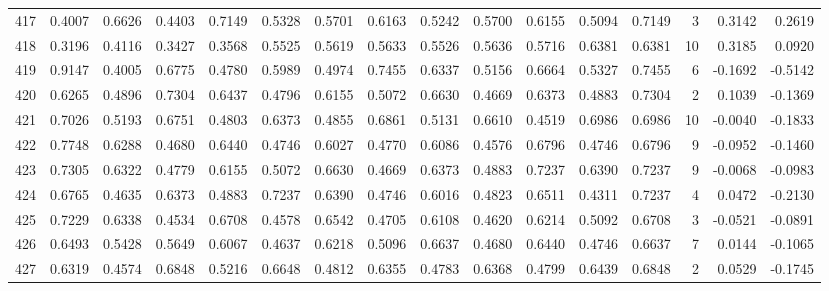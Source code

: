 \begin{tabular}{lrrrrrrrrrrrrrrr}
417 &      0.4007 &  0.6626 &  0.4403 &  0.7149 &  0.5328 &  0.5701 &  0.6163 &  0.5242 &  0.5700 &  0.6155 &   0.5094 &     0.7149 &      3 &                    0.3142 &                     0.2619 \\
418 &      0.3196 &  0.4116 &  0.3427 &  0.3568 &  0.5525 &  0.5619 &  0.5633 &  0.5526 &  0.5636 &  0.5716 &   0.6381 &     0.6381 &     10 &                    0.3185 &                     0.0920 \\
419 &      0.9147 &  0.4005 &  0.6775 &  0.4780 &  0.5989 &  0.4974 &  0.7455 &  0.6337 &  0.5156 &  0.6664 &   0.5327 &     0.7455 &      6 &                   -0.1692 &                    -0.5142 \\
420 &      0.6265 &  0.4896 &  0.7304 &  0.6437 &  0.4796 &  0.6155 &  0.5072 &  0.6630 &  0.4669 &  0.6373 &   0.4883 &     0.7304 &      2 &                    0.1039 &                    -0.1369 \\
421 &      0.7026 &  0.5193 &  0.6751 &  0.4803 &  0.6373 &  0.4855 &  0.6861 &  0.5131 &  0.6610 &  0.4519 &   0.6986 &     0.6986 &     10 &                   -0.0040 &                    -0.1833 \\
422 &      0.7748 &  0.6288 &  0.4680 &  0.6440 &  0.4746 &  0.6027 &  0.4770 &  0.6086 &  0.4576 &  0.6796 &   0.4746 &     0.6796 &      9 &                   -0.0952 &                    -0.1460 \\
423 &      0.7305 &  0.6322 &  0.4779 &  0.6155 &  0.5072 &  0.6630 &  0.4669 &  0.6373 &  0.4883 &  0.7237 &   0.6390 &     0.7237 &      9 &                   -0.0068 &                    -0.0983 \\
424 &      0.6765 &  0.4635 &  0.6373 &  0.4883 &  0.7237 &  0.6390 &  0.4746 &  0.6016 &  0.4823 &  0.6511 &   0.4311 &     0.7237 &      4 &                    0.0472 &                    -0.2130 \\
425 &      0.7229 &  0.6338 &  0.4534 &  0.6708 &  0.4578 &  0.6542 &  0.4705 &  0.6108 &  0.4620 &  0.6214 &   0.5092 &     0.6708 &      3 &                   -0.0521 &                    -0.0891 \\
426 &      0.6493 &  0.5428 &  0.5649 &  0.6067 &  0.4637 &  0.6218 &  0.5096 &  0.6637 &  0.4680 &  0.6440 &   0.4746 &     0.6637 &      7 &                    0.0144 &                    -0.1065 \\
427 &      0.6319 &  0.4574 &  0.6848 &  0.5216 &  0.6648 &  0.4812 &  0.6355 &  0.4783 &  0.6368 &  0.4799 &   0.6439 &     0.6848 &      2 &                    0.0529 &                    -0.1745 \\

\end{tabular}
